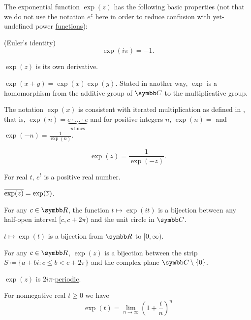 \begin{Proposition}\label{thm:exponential_function_properties}
  The exponential function \( \exp(z) \) has the following basic properties (not that we do not use the notation \( e^z \) here in order to reduce confusion with yet-undefined power \hyperref[def:power_function]{functions}):

  \begin{PropEnum}
     (Euler's identity)
    \begin{equation*}
      \exp(i \pi) = -1.
    \end{equation*}

     \( \exp(z) \) is its own derivative.

     \( \exp(x + y) = \exp(x) \exp(y) \). Stated in another way, \( \exp \) is a homomorphism from the additive group of \( \BC \) to the multiplicative group.

     The notation \( \exp(x) \) is consistent with iterated multiplication as defined in , that is, \( \exp(n) = \underbrace{e \cdot \ldots \cdot e}_{n \text{times}} \) and for positive integers \( n \), \( \exp(n) =  \) and \( \exp(-n) =\tfrac 1 {\exp(n)} \).

    \begin{equation*}
      \exp(z) = \frac 1 {\exp(-z)}.
    \end{equation*}

     For real \( t \), \( e^t \) is a positive real number.

     \( \overline{\exp(z)} = \exp(\overline{z}) \).

     For any \( c \in \BR \), the function \( t \mapsto \exp(it) \) is a bijection between any half-open interval \( [c, c + 2\pi) \) and the unit circle in \( \BC \).

     \( t \mapsto \exp(t) \) is a bijection from \( \BR \) to \( [0, \infty) \).

     For any \( c \in \BR \), \( \exp(z) \) is a bijection between the strip \( S \coloneqq \{ a + bi \colon c \leq b < c + 2\pi \} \) and the complex plane \( \BC \setminus \{ 0 \} \).

     \( \exp(z) \) is \( 2i\pi \)-\hyperref[def:periodic_function]{periodic}.

     For nonnegative real \( t \geq 0 \) we have
    \begin{equation*}
      \exp(t) = \lim_{n \to \infty} \left(1 + \frac t n \right)^n
    \end{equation*}
  \end{PropEnum}
\end{Proposition}
